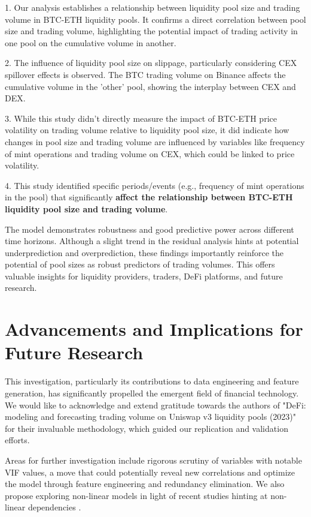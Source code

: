 \documentclass{article}
\begin{document}
1. Our analysis establishes a relationship between liquidity pool size and trading volume in BTC-ETH liquidity pools. It confirms a direct correlation between pool size and trading volume, highlighting the potential impact of trading activity in one pool on the cumulative volume in another.

2. The influence of liquidity pool size on slippage, particularly considering CEX spillover effects is observed. The BTC trading volume on Binance affects the cumulative volume in the 'other' pool, showing the interplay between CEX and DEX.

3. While this study didn't directly measure the impact of BTC-ETH price volatility on trading volume relative to liquidity pool size, it did indicate how changes in pool size and trading volume are influenced by variables like frequency of mint operations and trading volume on CEX, which could be linked to price volatility.

4. This study identified specific periods/events (e.g., frequency of mint operations in the pool) that significantly \textbf{affect the relationship between BTC-ETH liquidity pool size and trading volume}.

The model demonstrates robustness and good predictive power across different time horizons. Although a slight trend in the residual analysis hints at potential underprediction and overprediction, these findings importantly reinforce the potential of pool sizes as robust predictors of trading volumes. This offers valuable insights for liquidity providers, traders, DeFi platforms, and future research.

\section{Advancements and Implications for Future Research}

This investigation, particularly its contributions to data engineering and feature generation, has significantly propelled the emergent field of financial technology. We would like to acknowledge and extend gratitude towards the authors of "DeFi: modeling and forecasting trading volume on Uniswap v3 liquidity pools (2023)" \cite{Makarov2022,Miori2023} for their invaluable methodology, which guided our replication and validation efforts.

Areas for further investigation include rigorous scrutiny of variables with notable VIF values, a move that could potentially reveal new correlations and optimize the model through feature engineering and redundancy elimination. We also propose exploring non-linear models in light of recent studies hinting at non-linear dependencies \cite{Makarov2022,Miori2023}.
\end{document}
